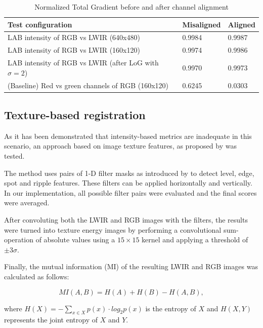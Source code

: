 \documentclass{l4proj}
\begin{document}
\begin{table}[ht]
  \centering
  \begin{tabular}{@{}lll@{}}
  \toprule
  \textbf{Test configuration}                             & \textbf{Misaligned} & \textbf{Aligned} \\ \midrule
  LAB intensity of RGB vs LWIR (640x480)     & 0.9984              & 0.9987           \\
  LAB intensity of RGB vs LWIR (160x120)    & 0.9974              & 0.9986           \\
  LAB intensity of RGB vs LWIR (after LoG with $\sigma=2$) & 0.9970              & 0.9973           \\
  (Baseline) Red vs green channels of RGB (160x120)                  & 0.6245              & 0.0303           \\ \bottomrule
  \end{tabular}
  \caption{Normalized Total Gradient before and after channel alignment}
  \label{table:registration_ntg}
\end{table}


\subsection{Texture-based registration}

As it has been demonstrated that intensity-based metrics are inadequate in this scenario, an approach based on image texture features, as proposed by \citet{jarc_graz_2007} was tested. 

The method uses pairs of 1-D filter masks as introduced by \citet{laws_rapid_1980} to detect level, edge, spot and ripple features. These filters can be applied horizontally and vertically. In our implementation, all possible filter pairs were evaluated and the final scores were averaged.

After convoluting both the LWIR and RGB images with the filters, the results were turned into texture energy images by performing a convolutional sum-operation of absolute values using a $15 \times 15$ kernel and applying a threshold of $\pm 3 \sigma$. 

Finally, the mutual information (MI) of the resulting LWIR and RGB images was calculated as follows:

\begin{equation}
  MI(A,B) = H(A) + H(B) - H(A,B),
\end{equation}

where $H(X) = - \sum_{x \in X} p(x) \cdot log_2 p(x)$ is the entropy of $X$ and $H(X,Y)$ represents the joint entropy of $X$ and $Y$.
\end{document}
